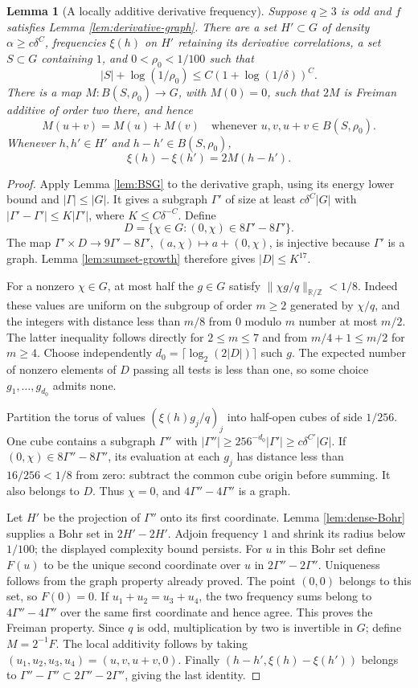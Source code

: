\documentclass[11pt]{article}
\newtheorem{lemma}[theorem]{Lemma}
\theoremstyle{definition}
\newcommand{\R}{\mathbb R}
\newcommand{\Z}{\mathbb Z}
\numberwithin{equation}{section}
\begin{document}
\begin{lemma}[A locally additive derivative frequency]\label{lem:local-frequency}
Suppose $q\ge3$ is odd and $f$ satisfies Lemma \ref{lem:derivative-graph}. There are a set $H'\subset G$ of density $\alpha\ge c\delta^C$, frequencies $\xi(h)$ on $H'$ retaining its derivative correlations, a set $S\subset G$ containing $1$, and $0<\rho_0<1/100$ such that
\[
 |S|+\log(1/\rho_0)\le C(1+\log(1/\delta))^C.
\]
There is a map $M:B(S,\rho_0)\to G$, with $M(0)=0$, such that $2M$ is Freiman additive of order two there, and hence
\[
 M(u+v)=M(u)+M(v)
 \quad\text{whenever }u,v,u+v\in B(S,\rho_0).
\]
Whenever $h,h'\in H'$ and $h-h'\in B(S,\rho_0)$,
\[
 \xi(h)-\xi(h')=2M(h-h').
\]
\end{lemma}
\begin{proof}
Apply Lemma \ref{lem:BSG} to the derivative graph, using its energy lower bound and $|\Gamma|\le|G|$. It gives a subgraph $\Gamma'$ of size at least $c\delta^C|G|$ with $|\Gamma'-\Gamma'|\le K|\Gamma'|$, where $K\le C\delta^{-C}$. Define
\[
 D=\{\chi\in G:(0,\chi)\in8\Gamma'-8\Gamma'\}.
\]
The map $\Gamma'\times D\to9\Gamma'-8\Gamma'$, $(a,\chi)\mapsto a+(0,\chi)$, is injective because $\Gamma'$ is a graph. Lemma \ref{lem:sumset-growth} therefore gives $|D|\le K^{17}$.

For a nonzero $\chi\in G$, at most half the $g\in G$ satisfy $\|\chi g/q\|_{\R/\Z}<1/8$. Indeed these values are uniform on the subgroup of order $m\ge2$ generated by $\chi/q$, and the integers with distance less than $m/8$ from $0$ modulo $m$ number at most $m/2$. The latter inequality follows directly for $2\le m\le7$ and from $m/4+1\le m/2$ for $m\ge4$. Choose independently $d_0=\lceil\log_2(2|D|)\rceil$ such $g$. The expected number of nonzero elements of $D$ passing all tests is less than one, so some choice $g_1,\ldots,g_{d_0}$ admits none.

Partition the torus of values $(\xi(h)g_j/q)_j$ into half-open cubes of side $1/256$. One cube contains a subgraph $\Gamma''$ with $|\Gamma''|\ge256^{-d_0}|\Gamma'|\ge c\delta^{C'}|G|$. If $(0,\chi)\in8\Gamma''-8\Gamma''$, its evaluation at each $g_j$ has distance less than $16/256<1/8$ from zero: subtract the common cube origin before summing. It also belongs to $D$. Thus $\chi=0$, and $4\Gamma''-4\Gamma''$ is a graph.

Let $H'$ be the projection of $\Gamma''$ onto its first coordinate. Lemma \ref{lem:dense-Bohr} supplies a Bohr set in $2H'-2H'$. Adjoin frequency $1$ and shrink its radius below $1/100$; the displayed complexity bound persists. For $u$ in this Bohr set define $F(u)$ to be the unique second coordinate over $u$ in $2\Gamma''-2\Gamma''$. Uniqueness follows from the graph property already proved. The point $(0,0)$ belongs to this set, so $F(0)=0$. If $u_1+u_2=u_3+u_4$, the two frequency sums belong to $4\Gamma''-4\Gamma''$ over the same first coordinate and hence agree. This proves the Freiman property. Since $q$ is odd, multiplication by two is invertible in $G$; define $M=2^{-1}F$. The local additivity follows by taking $(u_1,u_2,u_3,u_4)=(u,v,u+v,0)$. Finally $(h-h',\xi(h)-\xi(h'))$ belongs to $\Gamma''-\Gamma''\subset2\Gamma''-2\Gamma''$, giving the last identity.
\end{proof}
\end{document}
